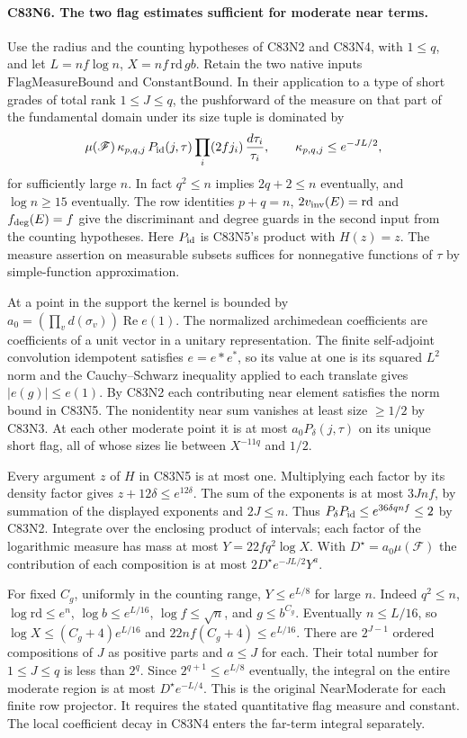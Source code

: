 \paragraph{C83N6. The two flag estimates sufficient for moderate near terms.}
Use the radius and the counting hypotheses of C83N2 and C83N4, with
$1\le q$, and let $L=nf\log n$, $X=nf\,\mathrm{rd}\,g b$.
Retain the two native inputs $\mathrm{FlagMeasureBound}$ and
$\mathrm{ConstantBound}$. In their application to a type of short
grades of total rank $1\le J\le q$, the pushforward of the measure
on that part of the fundamental domain under its size tuple is
dominated by
\[
 \mu(\mathscr F)\,\kappa_{p,q,j}\,
 P_{\rm id}(j,\tau)\prod_i(2fj_i)\,\frac{d\tau_i}{\tau_i},
 \qquad \kappa_{p,q,j}\le e^{-JL/2},
\]
for sufficiently large $n$. In fact $q^2\le n$ implies $2q+2\le n$ eventually, and $\log n\ge15$ eventually. The row identities $p+q=n$, $2v_{\rm inv}(E)=\mathrm{rd}$ and $f_{\rm deg}(E)=f$ give the discriminant and degree guards in the second input from the counting hypotheses. Here
$P_{\rm id}$ is C83N5's product with $H(z)=z$.
The measure assertion on measurable subsets suffices for
nonnegative functions of $\tau$ by simple-function approximation.

At a point in the support the kernel is bounded by
$a_0=(\prod_v d(\sigma_v))\operatorname{Re}e(1)$.
The normalized archimedean coefficients are coefficients of a unit
vector in a unitary representation. The finite self-adjoint
convolution idempotent satisfies $e=e*e^*$, so its value at one is its
squared $L^2$ norm and the Cauchy--Schwarz inequality applied to
each translate gives $|e(g)|\le e(1)$. By C83N2 each contributing
near element satisfies the norm bound in C83N5. The nonidentity
near sum vanishes at least size $\ge1/2$ by C83N3. At each other
moderate point it is at most $a_0P_\delta(j,\tau)$ on its unique
short flag, all of whose sizes lie between $X^{-11q}$ and $1/2$.

Every argument $z$ of $H$ in C83N5 is at most one. Multiplying each
factor by its density factor gives $z+12\delta\le e^{12\delta}$.
The sum of the exponents is at most $3Jnf$, by summation of the
displayed exponents and $2J\le n$. Thus
$P_\delta P_{\rm id}\le e^{36\delta qnf}\le2$ by C83N2.
Integrate over the enclosing product of intervals; each factor
of the logarithmic measure has mass at most
$Y=22f q^2\log X$. With $D^\star=a_0\mu(\mathscr F)$ the
contribution of each composition is at most $2D^\star e^{-JL/2}Y^a$.

For fixed $C_g$, uniformly in the counting range, $Y\le e^{L/8}$
for large $n$. Indeed $q^2\le n$, $\log\mathrm{rd}\le e^n$,
$\log b\le e^{L/16}$, $\log f\le\sqrt n$, and $g\le b^{C_g}$.
Eventually $n\le L/16$, so
$\log X\le(C_g+4)e^{L/16}$ and
$22nf(C_g+4)\le e^{L/16}$.
There are $2^{J-1}$ ordered compositions of $J$ as positive
parts and $a\le J$ for each. Their total number for $1\le J\le q$
is less than $2^q$. Since $2^{q+1}\le e^{L/8}$ eventually, the
integral on the entire moderate region is at most
$D^\star e^{-L/4}$. This is the original $\mathrm{NearModerate}$
for each finite row projector. It requires the stated quantitative
flag measure and constant. The local coefficient decay in C83N4
enters the far-term integral separately.
